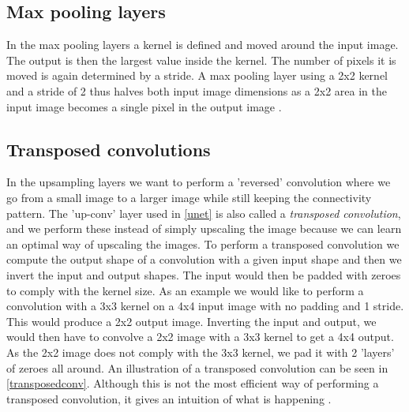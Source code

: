 \subsection{Max pooling layers}
In the max pooling layers a kernel is defined and moved around the input image. The output is then the largest value inside the kernel. The number of pixels it is moved is again determined by a stride. A max pooling layer using a 2x2 kernel and a stride of 2 thus halves both input image dimensions as a 2x2 area in the input image becomes a single pixel in the output image \cite{convolutionarticle}.

\subsection{Transposed convolutions}
In the upsampling layers we want to perform a 'reversed' convolution where we go from a small image to a larger image while still keeping the connectivity pattern. The 'up-conv' layer used in \autoref{unet} is also called a \textit{transposed convolution}, and we perform these instead of simply upscaling the image because we can learn an optimal way of upscaling the images. To perform a transposed convolution we compute the output shape of a convolution with a given input shape and then we invert the input and output shapes. The input would then be padded with zeroes to comply with the kernel size. As an example we would like to perform a convolution with a 3x3 kernel on a 4x4 input image with no padding and 1 stride. This would produce a 2x2 output image. Inverting the input and output, we would then have to convolve a 2x2 image with a 3x3 kernel to get a 4x4 output. As the 2x2 image does not comply with the 3x3 kernel, we pad it with 2 'layers' of zeroes all around. An illustration of a transposed convolution can be seen in \autoref{transposedconv}. Although this is not the most efficient way of performing a transposed convolution, it gives an intuition of what is happening \cite{convolutionarticle}.

